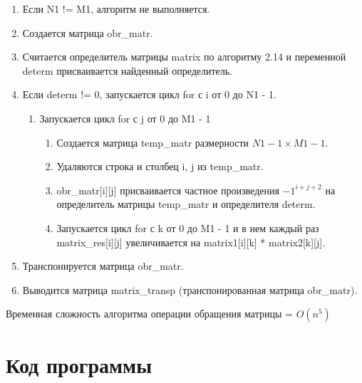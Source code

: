 \documentclass[bachelor, och, labwork]{shiza}
\begin{document}
		\begin{enumerate} 
			\item Если N1 != M1, алгоритм не выполняется.
			\item Создается матрица obr\_matr.
			\item Считается определитель матрицы matrix по алгоритму 2.14 и переменной determ присваивается найденный определитель.
			\item Если determ != 0, запускается цикл for с i от 0 до N1 - 1.
			\begin{enumerate} 
				\item Запускается цикл for с j от 0 до M1 - 1
				\begin{enumerate} 
					\item Создается матрица temp\_matr размерности $N1 - 1 \times M1 - 1$.
					\item Удаляются строка и столбец i, j из temp\_matr.
					\item obr\_matr[i][j] присваивается частное произведения $-1^{i + j + 2}$ на определитель матрицы temp\_matr и определителя determ. 
					\item Запускается цикл for с k от 0 до M1 - 1 и в нем каждый раз matrix\_res[i][j] увеличивается на
					matrix1[i][k] * matrix2[k][j].
				\end{enumerate}
			\end{enumerate}
			\item Транспонируется матрица obr\_matr.
			\item Выводится матрица matrix\_transp (транспонированная матрица obr\_matr).
		\end{enumerate} 
	
	Временная сложность алгоритма операции обращения матрицы = $O(n^5)$

	
	
	
	\section{Код программы}		
	
\end{document}
